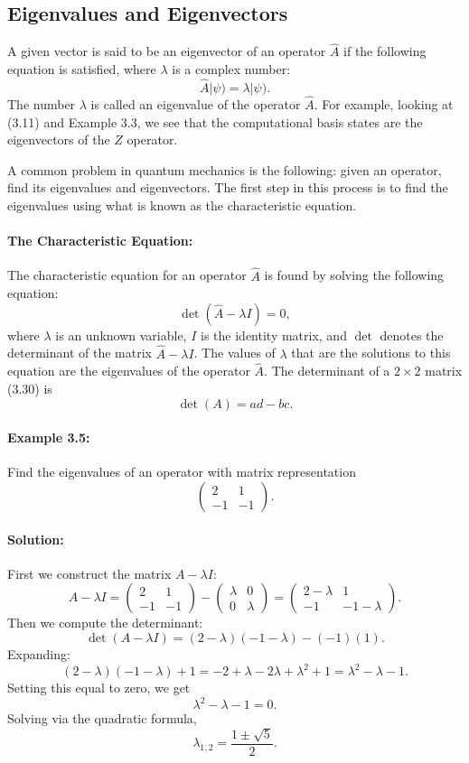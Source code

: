 \documentclass{article}
\begin{document}
\subsection{Eigenvalues and Eigenvectors}

A given vector is said to be an eigenvector of an operator \(\hat{A}\) if the following equation is satisfied, where \(\lambda\) is a complex number:
\[
\hat{A}|\psi) = \lambda|\psi).
\]
The number \(\lambda\) is called an eigenvalue of the operator \(\hat{A}\). For example, looking at (3.11) and Example 3.3, we see that the computational basis states are the eigenvectors of the \(Z\) operator.

A common problem in quantum mechanics is the following: given an operator,
find its eigenvalues and eigenvectors. The first step in this process is to find the eigenvalues using what is known as the characteristic equation.

\paragraph{The Characteristic Equation:}
The characteristic equation for an operator \(\hat{A}\) is found by solving the following equation:
\[
\det(\hat{A} - \lambda I) = 0,
\tag{3.36}
\]
where \(\lambda\) is an unknown variable, \(I\) is the identity matrix, and \(\det\) denotes the determinant of the matrix \(\hat{A} - \lambda I\). The values of \(\lambda\) that are the solutions to this equation are the eigenvalues of the operator \(\hat{A}\). The determinant of a \(2 \times 2\) matrix (3.30) is
\[
\det(A) = ad - bc.
\tag{3.37}
\]

\paragraph{Example 3.5:}  
Find the eigenvalues of an operator with matrix representation
\[
\begin{pmatrix}
2  &  1 \\
-1 & -1
\end{pmatrix}.
\]

\paragraph{Solution:}
First we construct the matrix \(A - \lambda I\):
\[
A - \lambda I
= \begin{pmatrix}
2 & 1 \\
-1 & -1
\end{pmatrix}
-
\begin{pmatrix}
\lambda & 0 \\
0 & \lambda
\end{pmatrix}
=
\begin{pmatrix}
2 - \lambda & 1 \\
-1 & -1 - \lambda
\end{pmatrix}.
\]
Then we compute the determinant:
\[
\det(A - \lambda I) 
= (2 - \lambda)(-1 - \lambda) - (-1)(1).
\]
Expanding:
\[
(2 - \lambda)(-1 - \lambda) + 1 
= -2 + \lambda -2\lambda + \lambda^2 + 1 
= \lambda^2 - \lambda -1.
\]
Setting this equal to zero, we get
\[
\lambda^2 - \lambda -1 = 0.
\]
Solving via the quadratic formula, 
\[
\lambda_{1,2}
= \frac{1 \pm \sqrt{5}}{2}.
\]
\end{document}
